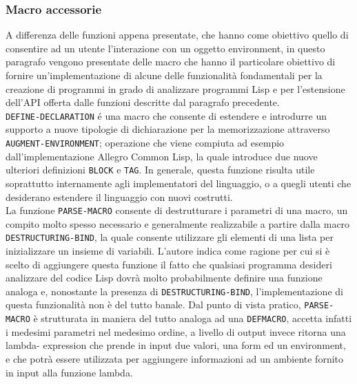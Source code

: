\subsubsection{Macro accessorie}

A differenza delle funzioni appena presentate, che hanno come obiettivo quello
di consentire ad un utente l'interazione con un oggetto environment, in questo
paragrafo vengono presentate delle macro che hanno il particolare obiettivo di
fornire un'implementazione di alcune delle funzionalità fondamentali per la
creazione di programmi in grado di analizzare programmi Lisp e per
l'estensione dell'API offerta dalle funzioni descritte dal paragrafo
precedente.\\

\texttt{DEFINE-DECLARATION} é una macro che consente di estendere e introdurre
un supporto a nuove tipologie di dichiarazione per la memorizzazione
attraverso \texttt {AUGMENT-ENVIRONMENT}; operazione che viene compiuta ad
esempio dall’implementazione Allegro Common Lisp, la quale introduce due nuove
ulteriori definizioni \texttt{BLOCK} e \texttt{TAG}. In generale, questa
funzione risulta utile soprattutto internamente agli implementatori del
linguaggio, o a quegli utenti che desiderano estendere il linguaggio con nuovi
costrutti.\\

La funzione \texttt{PARSE-MACRO} consente di destrutturare i parametri di una
macro, un compito molto spesso necessario e generalmente realizzabile a
partire dalla macro \texttt{DESTRUCTURING-BIND}, la quale consente utilizzare
gli elementi di una lista per inizializzare un insieme di variabili. L’autore
indica come ragione per cui si è scelto di aggiungere questa funzione il fatto
che qualsiasi programma desideri analizzare del codice Lisp dovrà molto
probabilmente definire una funzione analoga e, nonostante la presenza di
\texttt{DESTRUCTURING-BIND}, l’implementazione di questa funzionalità non è
del tutto banale. \cite{steele1990common} Dal punto di vista pratico, \texttt
{PARSE-MACRO} è strutturata in maniera del tutto analoga ad una
\texttt{DEFMACRO}, accetta infatti i medesimi parametri nel medesimo ordine, a
livello di output invece ritorna una lambda- expression che prende in input
due valori, una form ed un environment, e che potrà essere utilizzata per
aggiungere informazioni ad un ambiente fornito in input alla funzione
lambda.\\

